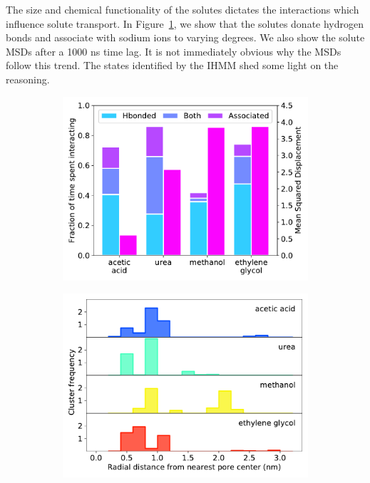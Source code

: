 \documentclass[journal=jpcbfk,manuscript=article]{achemso}
\begin{document}
  The size and chemical functionality of the solutes dictates the interactions which
  influence solute transport. In Figure~\ref{fig:hbonds_assoc_summary}, we show that
  the solutes donate hydrogen bonds and associate with sodium ions to varying degrees.
  We also show the solute MSDs after a 1000 ns time lag. It is not immediately obvious
  why the MSDs follow this trend. The states identified by the IHMM shed
  some light on the reasoning.
  
  \begin{figure}
  \centering
  \begin{subfigure}{0.45\textwidth}
  \includegraphics[width=\textwidth]{hbonds_assoc_summary.pdf}
  \caption{}\label{fig:hbonds_assoc_summary}
  \end{subfigure}
  \begin{subfigure}{0.45\textwidth}
  \includegraphics[width=\textwidth]{rdf_summary.pdf}

\end{subfigure}
\end{figure}
\end{document}
